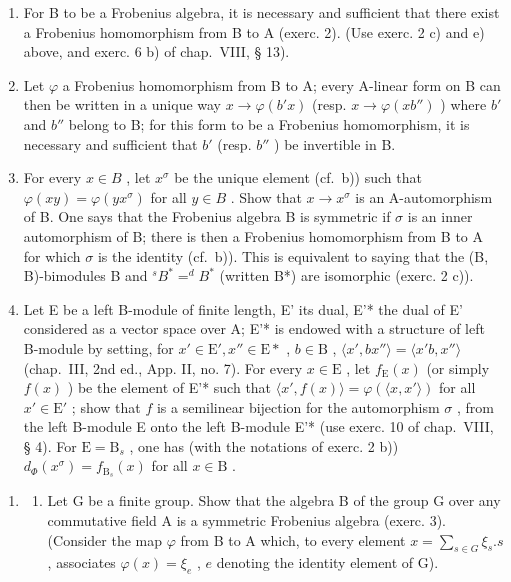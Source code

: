 \begin{enumerate}
\def\labelenumi{\alph{enumi})}
\item
  For B to be a Frobenius algebra, it is necessary and sufficient that there exist a Frobenius homomorphism from B to A (exerc. 2). (Use exerc. 2 c) and e) above, and exerc. 6 b) of chap.~VIII, § 13).
\item
  Let \(\varphi\) a Frobenius homomorphism from B to A; every A-linear form on B can then be written in a unique way \(x \to \varphi(b'x)\) (resp. \(x \to \varphi(xb'')\) ) where \(b'\) and \(b''\) belong to B; for this form to be a Frobenius homomorphism, it is necessary and sufficient that \(b'\) (resp. \(b''\) ) be invertible in B.
\item
  For every \(x \in B\) , let \(x^{\sigma}\) be the unique element (cf.~b)) such that \(\varphi(xy) = \varphi(yx^{\sigma})\) for all \(y \in B\) . Show that \(x \to x^{\sigma}\) is an A-automorphism of B. One says that the Frobenius algebra B is symmetric if \(\sigma\) is an inner automorphism of B; there is then a Frobenius homomorphism from B to A for which \(\sigma\) is the identity (cf.~b)). This is equivalent to saying that the (B, B)-bimodules B and \(^{s}B^{*} = ^{d}B^{*}\) (written B*) are isomorphic (exerc. 2 c)).
\item
  Let E be a left B-module of finite length, E' its dual, E'* the dual of E' considered as a vector space over A; E'* is endowed with a structure of left B-module by setting, for \(x' \in \mathrm{E}', x'' \in \mathrm{E}*\) , \(b \in \mathrm{B}\) , \(\langle x', bx'' \rangle = \langle x'b, x'' \rangle\) (chap.~III, 2nd ed., App. II, no. 7). For every \(x \in \mathrm{E}\) , let \(f_{\mathrm{E}}(x)\) (or simply \(f(x)\) ) be the element of E'* such that \(\langle x', f(x) \rangle = \varphi(\langle x, x' \rangle)\) for all \(x' \in \mathrm{E}'\) ; show that \(f\) is a semilinear bijection for the automorphism \(\sigma\) , from the left B-module E onto the left B-module E'* (use exerc. 10 of chap.~VIII, § 4). For \(\mathrm{E} = \mathrm{B}_s\) , one has (with the notations of exerc. 2 b)) \(d_{\Phi}(x^{\sigma}) = f_{\mathrm{B}_s}(x)\) for all \(x \in \mathrm{B}\) .
\end{enumerate}

\begin{enumerate}
\def\labelenumi{\arabic{enumi})}
\setcounter{enumi}{3}
\tightlist
\item
  \begin{enumerate}
  \def\labelenumii{\alph{enumii})}
  \tightlist
  \item
    Let G be a finite group. Show that the algebra B of the group G over any commutative field A is a symmetric Frobenius algebra (exerc. 3). (Consider the map \(\varphi\) from B to A which, to every element \(x = \sum_{s \in G} \xi_s.s\) , associates \(\varphi(x) = \xi_e\) , \(e\) denoting the identity element of G).
  \end{enumerate}
\end{enumerate}

